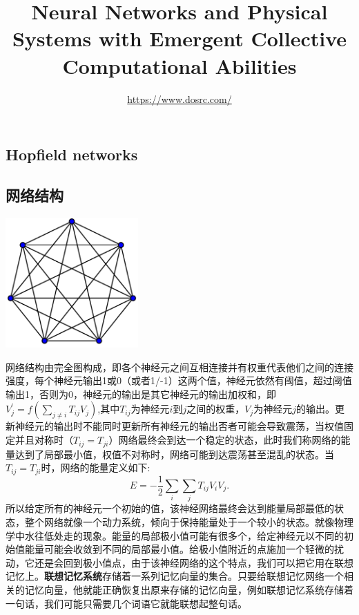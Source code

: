\documentclass{article} %
\title{Neural Networks and Physical Systems with Emergent Collective Computational Abilities}
\author{
 \url{https://www.dosrc.com/}
}
\begin{document}
\begin{CJK*}{UTF8}{gkai}

\maketitle

\section{Hopfield networks}
\subsection{网络结构}
\begin{center}
\includegraphics[width=2in]{complete-graph.png}
\end{center}
网络结构由完全图构成，即各个神经元之间互相连接并有权重代表他们之间的连接强度，每个神经元输出1或0（或者1/-1）这两个值，神经元依然有阈值，超过阈值输出1，否则为0，神经元的输出是其它神经元的输出加权和，即$ V _{j}^{\prime} = f \left( \sum _{j \neq i} T _{ij} V _{j} \right) $,其中$T _{ij}$为神经元$i$到$j$之间的权重，$V _{j}$为神经元$j$的输出。更新神经元的输出时不能同时更新所有神经元的输出否者可能会导致震荡，当权值固定并且对称时（$T _{ij}=T _{ji}$）网络最终会到达一个稳定的状态，此时我们称网络的能量达到了局部最小值，权值不对称时，网络可能到达震荡甚至混乱的状态。当$T _{ij}=T _{ji}$时，网络的能量定义如下:
$$ E = -\dfrac{1}{2} \sum _{i}\sum _{j} T _{ij}V _{i} V _{j}.$$
所以给定所有的神经元一个初始的值，该神经网络最终会达到能量局部最低的状态，整个网络就像一个动力系统，倾向于保持能量处于一个较小的状态。就像物理学中水往低处走的现象。能量的局部极小值可能有很多个，给定神经元以不同的初始值能量可能会收敛到不同的局部最小值。给极小值附近的点施加一个轻微的扰动，它还是会回到极小值点，由于该神经网络的这个特点，我们可以把它用在联想记忆上。\textbf{联想记忆系统}存储着一系列记忆向量的集合。只要给联想记忆网络一个相关的记忆向量，他就能正确恢复出原来存储的记忆向量，例如联想记忆系统存储着一句话，我们可能只需要几个词语它就能联想起整句话。


\end{CJK*}
\end{document}
